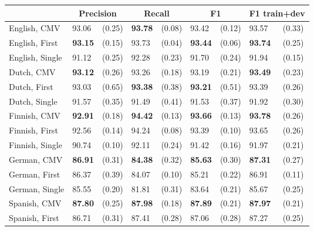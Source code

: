 \begin{table*}[t!]
\centering
\begin{tabular}{ll@{\hskip 5pt}cl@{\hskip 5pt}cl@{\hskip 5pt}cl@{\hskip 5pt}c}
                            & \multicolumn{2}{c}{Precision} & \multicolumn{2}{c}{Recall} & \multicolumn{2}{c}{F1} & \multicolumn{2}{c}{F1 train+dev} \\ \hline
English, CMV             & 93.06 & (0.25) & \textbf{93.78} & (0.08) & 93.42 & (0.12) & 93.57 & (0.33) \\  %
English, First          & \textbf{93.15} & (0.15) & 93.73 & (0.04) & \textbf{93.44} & (0.06) & \textbf{93.74} & (0.25)\\ %
English, Single         & 91.12 & (0.25) & 92.28 & (0.23) & 91.70 & (0.24) & 91.94 & (0.15)\\ \hline %
Dutch, CMV               & \textbf{93.12} & (0.26) & 93.26 & (0.18) & 93.19 & (0.21) &  \textbf{93.49} &  (0.23) \\ %
Dutch, First            & 93.03 & (0.65) & \textbf{93.38} & (0.38) & \textbf{93.21} & (0.51) & 93.39 & (0.26)\\ %
Dutch, Single           & 91.57 & (0.35) & 91.49 & (0.41) & 91.53 & (0.37) & 91.92 & (0.30)\\ \hline %
Finnish, CMV             & \textbf{92.91} & (0.18) & \textbf{94.42} & (0.13) & \textbf{93.66} & (0.13) & \textbf{93.78} & (0.26)\\ %
Finnish, First          & 92.56 & (0.14) & 94.24 & (0.08) & 93.39 & (0.10) & 93.65 & (0.26) \\ %
Finnish, Single         & 90.74 & (0.10) & 92.11 & (0.24) & 91.42 & (0.16) & 91.97 & (0.21) \\ \hline %
German, CMV              & \textbf{86.91} & (0.31) & \textbf{84.38} & (0.32) & \textbf{85.63} & (0.30) & \textbf{87.31} & (0.27)\\ %
German, First           & 86.37 & (0.39) & 84.07 & (0.10) & 85.21 & (0.22) & 86.91 & (0.11)\\ %
German, Single          & 85.55 & (0.20) & 81.81 & (0.31) & 83.64 & (0.21) & 85.67 & (0.25)\\ \hline %
Spanish, CMV              & \textbf{87.80} & (0.25) & \textbf{87.98} & (0.18) & \textbf{87.89} & (0.21) & \textbf{87.97} & (0.21)\\ %
Spanish, First           & 86.71 & (0.31) & 87.41 & (0.28) & 87.06 & (0.28) & 87.27 & (0.25)\\ %

\end{tabular}
\end{table*}
